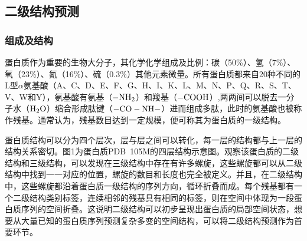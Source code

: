 \documentclass[a4paper, tikz]{article}
\begin{document}
\subsection{二级结构预测}%
\subsubsection{组成及结构}
蛋白质作为重要的生物大分子，其化学化学组成及比例：碳（50\%）、氢（7\%）、氧（23\%）、氮（16\%）、硫（0.3\%）其他元素微量。所有蛋白质都来自20种不同的L型$\alpha$氨基酸（A、C、D、E、F、G、H、I、K、L、M、N、P、Q、R、S、T、V、W和Y），氨基酸有氨基（$\rm -NH_2$）和羧基（$\rm -COOH$）,两两间可以脱去一分子水（$\rm H_2O$）缩合形成肽键（$\rm -CO-NH-$）进而组成多肽，此时的氨基酸也被称作残基。通常认为，残基数目达到一定规模，便可称其为蛋白质的一级结构。

蛋白质结构可以分为四个层次，层与层之间可以转化，每一层的结构都与上一层的结构关系密切。图1为蛋白质PDB\ 105M的四层结构示意图。观察该蛋白质的二级结构和三级结构，可以发现在三级结构中存在有许多螺旋，这些螺旋都可以从二级结构中找到一一对应的位置，螺旋的数目和长度也完全被定义。并且，在二级结构中，这些螺旋都沿着蛋白质一级结构的序列方向，循环折叠而成。每个残基都有一个二级结构类别标签，连续相邻的残基具有相同的标签，则在空间中体现为一段蛋白质序列的空间折叠。这说明二级结构可以初步呈现出蛋白质的局部空间状态，想要从大量已知的蛋白质序列预测复杂多变的空间结构，可以将二级结构预测作为首要环节。
\end{document}
